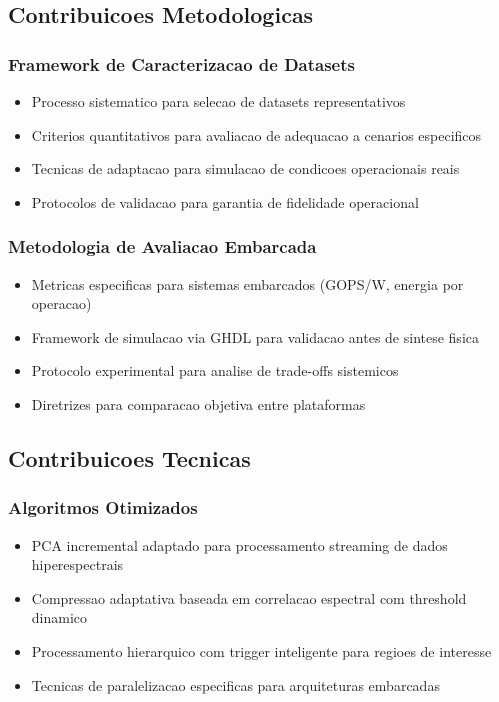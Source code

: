 \subsection{Contribuicoes Metodologicas}

\subsubsection{Framework de Caracterizacao de Datasets}
\begin{itemize}
    \item Processo sistematico para selecao de datasets representativos
    \item Criterios quantitativos para avaliacao de adequacao a cenarios especificos
    \item Tecnicas de adaptacao para simulacao de condicoes operacionais reais
    \item Protocolos de validacao para garantia de fidelidade operacional
\end{itemize}

\subsubsection{Metodologia de Avaliacao Embarcada}
\begin{itemize}
    \item Metricas especificas para sistemas embarcados (GOPS/W, energia por operacao)
    \item Framework de simulacao via GHDL para validacao antes de sintese fisica
    \item Protocolo experimental para analise de trade-offs sistemicos
    \item Diretrizes para comparacao objetiva entre plataformas
\end{itemize}

\subsection{Contribuicoes Tecnicas}

\subsubsection{Algoritmos Otimizados}
\begin{itemize}
    \item PCA incremental adaptado para processamento streaming de dados hiperespectrais
    \item Compressao adaptativa baseada em correlacao espectral com threshold dinamico
    \item Processamento hierarquico com trigger inteligente para regioes de interesse
    \item Tecnicas de paralelizacao especificas para arquiteturas embarcadas
\end{itemize}

